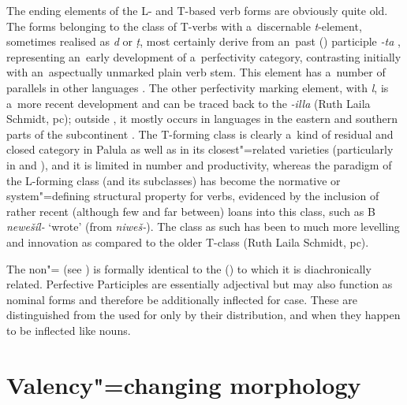 The ending elements of the L- and T-based  verb forms are obviously quite old. The  forms belonging to the class of T-verbs with a~discernable \textit{t}-element, sometimes realised as \textit{d} or \textit{ṭ}, most certainly derive from an~\iliOIA past () participle \textit{-ta} \citep[952]{whitney1960}, representing an~early development of a~perfectivity category, contrasting initially with an~aspectually unmarked plain verb stem. This element has a~number of parallels in other \iliNIA languages \citep[269, 272]{masica1991}. The other perfectivity marking element, with \textit{l}, is a~more recent development and can be traced back to the \iliPrakrit \textit{-illa} (Ruth Laila Schmidt, pc); outside \iliShina, it mostly occurs in \iliNIA languages in the eastern and southern parts of the subcontinent \citep[270]{masica1991}. The T-forming class is clearly a~kind of residual and closed category in Palula as well as in its closest"=related varieties (particularly in \iliSauji and \iliKalkoti), and it is limited in number and productivity, whereas the paradigm of the L-forming class (and its subclasses) has become the normative or system"=defining structural property \citep[104]{mcmahon1994} for verbs, evidenced by the inclusion of rather recent (although few and far between) loans into this class, such as B \textit{newešíl-} `wrote' (from \iliKhowar \textit{niweš-}). The class as such has been  to much more levelling and innovation as compared to the older T-class (Ruth Laila Schmidt, pc).


The non"=  (see ) is formally identical to the   () to which it is diachronically related. Perfective Participles are essentially adjectival but may also function as nominal forms and therefore be additionally inflected for case. These are distinguished from the  used for   only by their distribution, and when they happen to be inflected like nouns.


\section{Valency"=changing morphology}
\label{sec:8-5}

